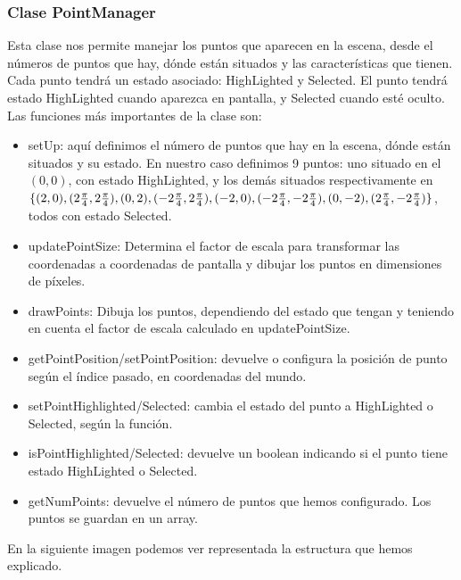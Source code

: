 \documentclass[a4paper,11pt, oneside]{book}
\begin{document}
\subsubsection{Clase PointManager}

Esta clase nos permite manejar los puntos que aparecen en la escena, desde el números de puntos que hay, dónde están situados y las características que tienen. Cada punto tendrá un estado asociado: HighLighted y Selected. El punto tendrá estado HighLighted cuando aparezca en pantalla, y Selected cuando esté oculto. Las funciones más importantes de la clase son:

\begin{itemize}
	\item setUp: aquí definimos el número de puntos que hay en la escena, dónde están situados y su estado. En nuestro caso definimos 9 puntos: uno situado en el $(0,0)$, con estado HighLighted, y los demás situados respectivamente en $\{(2,0), (2\frac{\pi}{4},2\frac{\pi}{4}), (0,2), (-2\frac{\pi}{4},2\frac{\pi}{4}), (-2,0), (-2\frac{\pi}{4},-2\frac{\pi}{4}),\\ (0,-2), (2\frac{\pi}{4},-2\frac{\pi}{4})\}$, todos con estado Selected.
	
	\item updatePointSize: Determina el factor de escala para transformar las coordenadas a coordenadas de pantalla y dibujar los puntos en dimensiones de píxeles.
	
	\item drawPoints: Dibuja los puntos, dependiendo del estado que tengan y teniendo en cuenta el factor de escala calculado en updatePointSize.
	
	\item getPointPosition/setPointPosition: devuelve o configura la posición de punto según el índice pasado, en coordenadas del mundo.
	
	\item setPointHighlighted/Selected: cambia el estado del punto a HighLighted o Selected, según la función.
	
	\item isPointHighlighted/Selected: devuelve un boolean indicando si el punto tiene estado HighLighted o Selected.
	
	\item getNumPoints: devuelve el número de puntos que hemos configurado. Los puntos se guardan en un array.
\end{itemize}

En la siguiente imagen podemos ver representada la estructura que hemos explicado.
\end{document}
